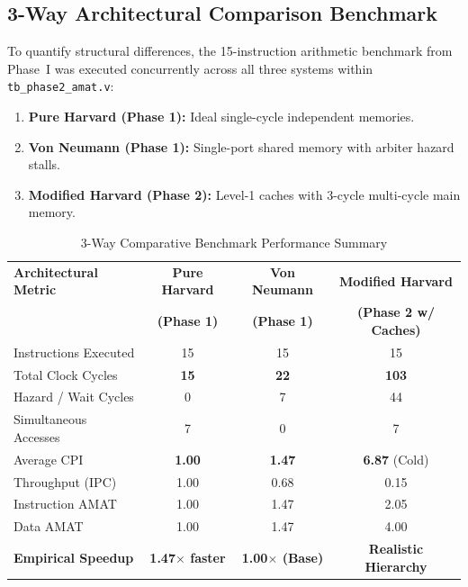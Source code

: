 \documentclass[conference]{IEEEtran}
\begin{document}
\subsection{3-Way Architectural Comparison Benchmark}
To quantify structural differences, the 15-instruction arithmetic benchmark from Phase~I was executed concurrently across all three systems within \texttt{tb\_phase2_amat.v}:
\begin{enumerate}
    \item \textbf{Pure Harvard (Phase 1):} Ideal single-cycle independent memories.
    \item \textbf{Von Neumann (Phase 1):} Single-port shared memory with arbiter hazard stalls.
    \item \textbf{Modified Harvard (Phase 2):} Level-1 caches with 3-cycle multi-cycle main memory.
\end{enumerate}

\begin{table}[htbp]
\caption{3-Way Comparative Benchmark Performance Summary}
\label{tab:3way-comparison}
\centering
\begin{tabular}{lccc}
\toprule
\textbf{Architectural Metric} & \textbf{Pure Harvard} & \textbf{Von Neumann} & \textbf{Modified Harvard} \\
 & \textbf{(Phase 1)} & \textbf{(Phase 1)} & \textbf{(Phase 2 w/ Caches)} \\
\midrule
Instructions Executed & 15 & 15 & 15 \\
Total Clock Cycles & \textbf{15} & \textbf{22} & \textbf{103} \\
Hazard / Wait Cycles & 0 & 7 & 44 \\
Simultaneous Accesses & 7 & 0 & 7 \\
Average CPI & \textbf{1.00} & \textbf{1.47} & \textbf{6.87} (Cold) \\
Throughput (IPC) & 1.00 & 0.68 & 0.15 \\
Instruction AMAT & 1.00 & 1.47 & 2.05 \\
Data AMAT & 1.00 & 1.47 & 4.00 \\
\midrule
\textbf{Empirical Speedup} & \textbf{1.47$\times$ faster} & \textbf{1.00$\times$ (Base)} & \textbf{Realistic Hierarchy} \\
\bottomrule
\end{tabular}
\end{table}
\end{document}
